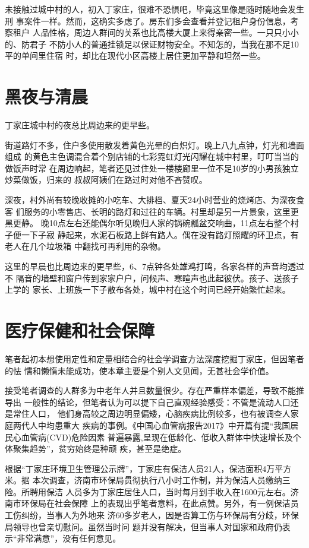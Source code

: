 未接触过城中村的人，初入丁家庄，很难不恐惧吧，毕竟这里像是随时随地会发生刑
事案件一样。然而，这确实多虑了。房东们多会查看并登记租户身份信息，考察租户
人品性格，周边人群间的关系也比高楼大厦上来得亲密一些。一只只小小的、防君子
不防小人的普通挂锁足以保证财物安全。不知怎的，当我在那不足10平的单间里住宿
时，却比在现代小区高楼上居住更加平静和坦然一些。

\section{黑夜与清晨}

丁家庄城中村的夜总比周边来的更早些。

街道路灯不多，住户多使用散发着黄色光晕的白炽灯。晚上八九点钟，灯光和墙面组成
的黄色主色调混合着个别店铺的七彩霓虹灯光闪耀在城中村里，叮叮当当的做饭声时常
在周边响起，笔者还见过住处一楼楼廊里一位不足10岁的小男孩独立炒菜做饭，归来的
叔叔阿姨们在路过时对他不吝赞叹。

深夜，村外尚有较晚收摊的小吃车、大排档、夏天24小时营业的烧烤店、为深夜食客
们服务的小零售店、长明的路灯和过往的车辆。村里却是另一片景象，这里更黑更静。
晚10点左右还能偶尔听见晚归人家的锅碗瓢盆交响曲，11点左右整个村子便一下子寂
静起来，水泥石板路上鲜有路人。偶在没有路灯照耀的环卫点，有老人在几个垃圾箱
中翻找可再利用的杂物。

这里的早晨也比周边来的更早些，6、7点钟各处雄鸡打鸣，各家各样的声音均透过不
隔音的墙壁和窗户传到家家户户，问候声、寒暄声也此起彼伏。孩子、送孩子上学的
家长、上班族一下子散布各处，城中村在这个时间已经开始繁忙起来。

\section{医疗保健和社会保障}

笔者起初本想使用定性和定量相结合的社会学调查方法深度挖掘丁家庄，但因笔者的怯
懦和懒惰未能成功，使本章主要是个别人文见闻，无甚社会学价值。

接受笔者调查的人群多为中老年人并且数量很少。存在严重样本偏差，导致不能推导出
一般性的结论，但笔者认为可以提下自己直观经验感受：不管是流动人口还是常住人口，
他们身高较之周边明显偏矮，心脑疾病比例较多，也有被调查人家庭两代人中均患重大
疾病的事例。《中国心血管病报告2017》中开篇有提“我国居民心血管病(CVD)危险因素
普遍暴露,呈现在低龄化、低收入群体中快速增长及个体聚集趋势”，贫穷始终是种顽
疾，甚至是绝症。

根据“丁家庄环境卫生管理公示牌”，丁家庄有保洁人员21人，保洁面积4万平方米。据
本次调查，济南市环保局贯彻执行八小时工作制，并为保洁人员缴纳三险。所聘用保洁
人员多为丁家庄居住人口，当时每月到手收入在1600元左右。济南市环保局在社会保障
上的表现出乎笔者意料，在此点赞。另外，有一例保洁员工伤纠纷，当事人为外地来
济60多岁老人，因是否算工伤与环保局有分歧，环保局领导也曾亲切慰问。虽然当时问
题并没有解决，但当事人对国家和政府仍表示“非常满意”，没有任何意见。


